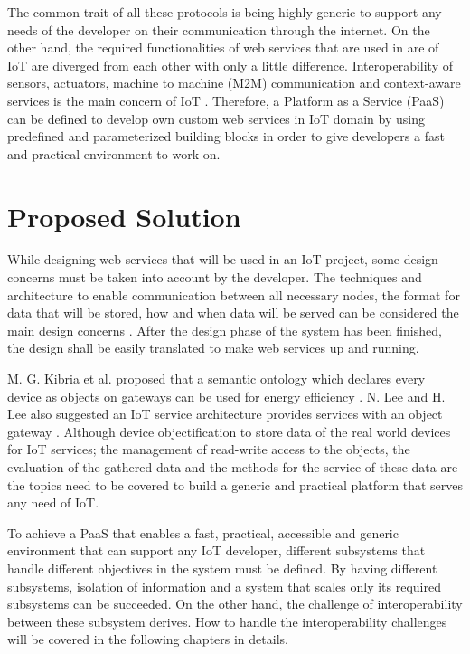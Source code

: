  The common trait of all these protocols is being highly generic to support any needs of the developer on their communication through the internet. On the other hand, the required functionalities of web services that are used in are of IoT are diverged from each other with only a little difference. Interoperability of sensors, actuators, machine to machine (M2M) communication and context-aware services is the main concern of IoT \cite{6651222}. Therefore, a Platform as a Service (PaaS) can be defined to develop own custom web services in IoT domain by using predefined and parameterized building blocks in order to give developers a fast and practical environment to work on.

\section{Proposed Solution}



While designing web services that will be used in an IoT project, some design concerns must be taken into account by the developer. The techniques and architecture to enable communication between all necessary nodes, the format for data that will be stored, how and when data will be served can be considered the main design concerns \cite{6651222}. After the design phase of the system has been finished, the design shall be easily translated to make web services up and running. 

M. G. Kibria et al. proposed that a semantic ontology which declares every device as objects on gateways can be used for energy efficiency \cite{7993747}. N. Lee and H. Lee also suggested an IoT service architecture provides services with an object gateway \cite{6884496}. Although device objectification to store data of the real world devices for IoT services; the management of read-write access to the objects, the evaluation of the gathered data and the methods for the service of these data are the topics need to be covered to build a generic and practical platform that serves any need of IoT. 


To achieve a PaaS that enables a fast, practical, accessible and generic environment that can support any IoT developer, different subsystems that handle different objectives in the system must be defined. By having different subsystems,  isolation of information and a system that scales only its required subsystems can be succeeded. On the other hand, the challenge of interoperability between these subsystem derives. How to handle the interoperability challenges will be covered in the following chapters in details.

